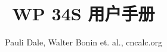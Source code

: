 \documentclass{fo-article}
\begin{document}
\title{WP 34S 用户手册}
\author{Pauli Dale, Walter Bonin et. al., cncalc.org}

\maketitle



\tableofcontents



%
%
%
%
%
%

%
%
%
%

%
\end{document}
